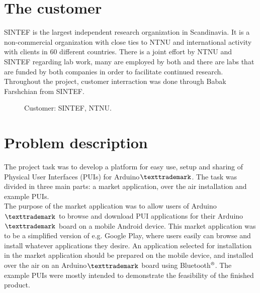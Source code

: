 \section{The customer}
\label{sec:sintef}
\label{sec:ntnu}
SINTEF is the largest independent research organization in Scandinavia. It is a non-commercial organization with close ties to NTNU and international activity with clients in 60 different countries. There is a joint effort by NTNU and SINTEF regarding lab work, many are employed by both and there are labs that are funded by both companies in order to facilitate continued research. \\
\newline
Throughout the project, customer interraction was done through Babak Farshchian from SINTEF.\\
\begin{figure}[H]
%
\hfill
{}%
\caption{Customer: \protect{\ref{fig:sintef}} SINTEF, \protect{\ref{fig:ntnu}} NTNU.}
\end{figure}

\section{Problem description}
The project task was to develop a platform for easy use, setup and sharing of Physical User Interfaces (PUIs) for Arduino$\texttrademark$. The task was divided in three main parts: a market application, over the air installation and example PUIs.\\
\newline
The purpose of the market application was to allow users of Arduino$\texttrademark$ to browse and download PUI applications for their Arduino$\texttrademark$ board on a mobile Android device. This market application was to be a simplified version of e.g. Google Play, where users easily can browse and install whatever applications they desire. An application selected for installation in the market application should be prepared on the mobile device, and installed over the air on an Arduino$\texttrademark$ board using Bluetooth$\textsuperscript{\textregistered}$. The example PUIs were mostly intended to demonstrate the feasibility of the finished product.

